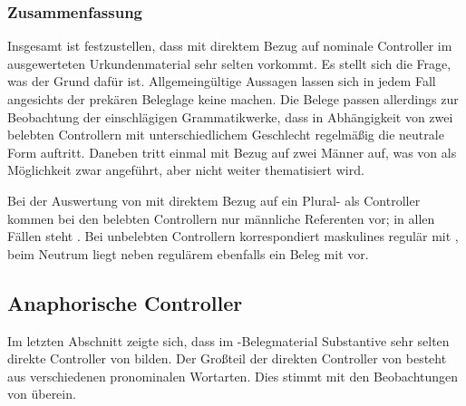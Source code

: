 \begin{exe}
\end{exe}

\subsubsection{Zusammenfassung}

Insgesamt ist festzustellen, dass  mit direktem Bezug auf nominale
Controller im ausgewerteten Urkundenmaterial sehr selten vorkommt.
Es stellt sich die Frage, was der Grund dafür ist. Allgemeingültige Aussagen
lassen sich in jedem Fall angesichts der prekären Beleglage keine machen. Die
Belege passen allerdings zur Beobachtung der einschlägigen Grammatikwerke, dass
in Abhängigkeit von zwei belebten Controllern mit unterschiedlichem
Geschlecht regelmäßig die neutrale Form  auftritt. Daneben tritt
 einmal mit Bezug auf zwei Männer auf, was von
\citet[384]{paul2007} als Möglichkeit zwar angeführt, aber nicht weiter
thematisiert wird.

Bei der Auswertung von  mit direktem Bezug auf ein
Plural- als Controller kommen bei den belebten
Controllern nur männliche Referenten vor; in allen Fällen steht .
Bei unbelebten Controllern korrespondiert maskulines 
regulär mit , beim Neutrum liegt neben regulärem 
ebenfalls ein Beleg mit  vor.

\subsection{Anaphorische Controller}
\label{subsec:refctrl}

Im letzten Abschnitt zeigte sich, dass im \CAO{}-Belegmaterial
Substantive sehr selten direkte Controller von 
bilden. Der Großteil der direkten Controller von  besteht aus
verschiedenen pronominalen Wortarten. Dies stimmt mit den Beobachtungen von
\citet[624--625]{ksw2} überein.

